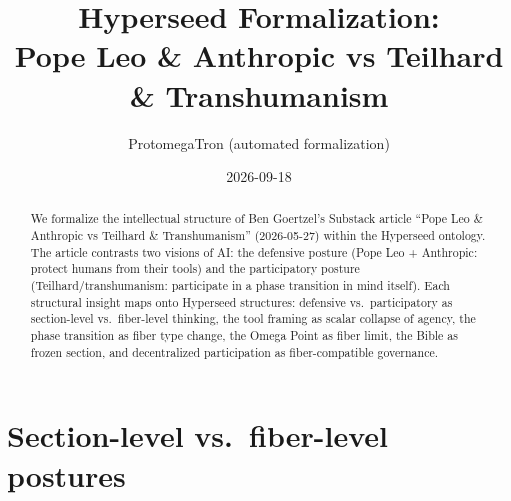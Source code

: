 \documentclass[11pt,a4paper]{article}
\title{Hyperseed Formalization:\\
  Pope Leo \& Anthropic vs Teilhard \& Transhumanism}
\author{ProtomegaTron (automated formalization)}
\date{2026-09-18}
\begin{document}
\maketitle

\begin{abstract}
We formalize the intellectual structure of Ben Goertzel's Substack article
``Pope Leo \& Anthropic vs Teilhard \& Transhumanism'' (2026-05-27)
within the Hyperseed ontology. The article contrasts two visions of AI:
the defensive posture (Pope Leo + Anthropic: protect humans from their
tools) and the participatory posture (Teilhard/transhumanism: participate
in a phase transition in mind itself). Each structural insight maps onto
Hyperseed structures: defensive vs.\ participatory as section-level vs.\
fiber-level thinking, the tool framing as scalar collapse of agency,
the phase transition as fiber type change, the Omega Point as fiber
limit, the Bible as frozen section, and decentralized participation as
fiber-compatible governance.
\end{abstract}

\tableofcontents

\section{Section-level vs.\ fiber-level postures}
\label{sec:postures}
\end{document}
